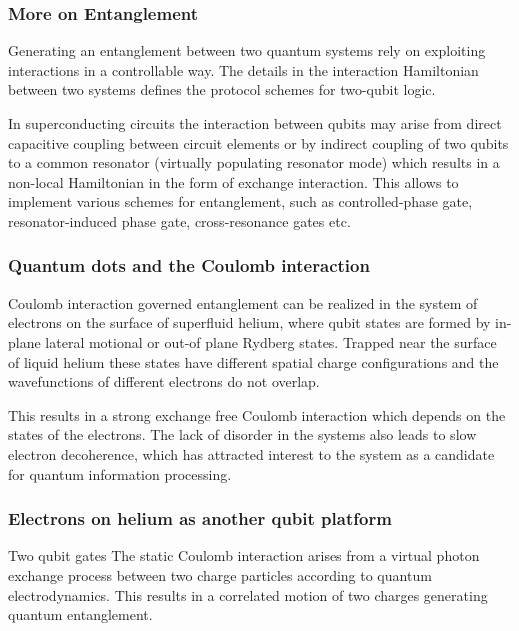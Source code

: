 \documentclass{beamer}
\begin{document}
\begin{frame}
\frametitle{More on Entanglement}

\begin{block}{}
Generating an entanglement between two quantum systems rely on
exploiting interactions in a controllable way. The details in the
interaction Hamiltonian between two systems defines the protocol
schemes for two-qubit logic.
\end{block}

\begin{block}{}
In  superconducting circuits the
interaction between qubits may arise from direct capacitive coupling
between circuit elements or by indirect coupling of two qubits to a
common resonator (virtually populating resonator mode) which results
in a non-local Hamiltonian in the form of exchange
interaction. This allows to implement various
schemes for entanglement, such as controlled-phase
gate, resonator-induced phase
gate, cross-resonance gates etc.
\end{block}
\end{frame}



\begin{frame}
\frametitle{Quantum dots and the Coulomb interaction}

\begin{block}{}
Coulomb interaction governed entanglement can be realized in
the system of electrons on the surface of superfluid helium, where
qubit states are formed by in-plane lateral motional or out-of plane
Rydberg states. Trapped near the surface of liquid helium these states
have different spatial charge configurations and the wavefunctions of
different electrons do not overlap.
\end{block}

\begin{block}{}
This results in a strong exchange
free Coulomb interaction which depends on the states of the
electrons. The lack of disorder in the systems
also leads to slow electron decoherence, which has attracted interest
to the system as a candidate for quantum information
processing.
\end{block}
\end{frame}

\begin{frame}
\frametitle{Electrons on helium as another qubit platform}


\begin{block}{Two qubit gates}
The static Coulomb interaction arises from a virtual photon exchange
 process between two charge particles according to quantum
 electrodynamics. This results in a correlated motion of two charges generating quantum entanglement. 
\end{block}
\end{frame}
\end{document}
